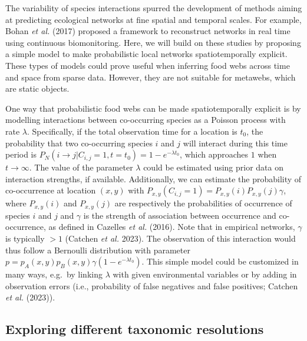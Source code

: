 \documentclass[10pt,oneside]{article}
\begin{document}
The variability of species interactions spurred the development of
methods aiming at predicting ecological networks at fine spatial and
temporal scales. For example, Bohan \emph{et al.} (2017) proposed a
framework to reconstruct networks in real time using continuous
biomonitoring. Here, we will build on these studies by proposing a
simple model to make probabilistic local networks spatiotemporally
explicit. These types of models could prove useful when inferring food
webs across time and space from sparse data. However, they are not
suitable for metawebs, which are static objects.

One way that probabilistic food webs can be made spatiotemporally
explicit is by modelling interactions between co-occurring species as a
Poisson process with rate \(\lambda\). Specifically, if the total
observation time for a location is \(t_0\), the probability that two
co-occurring species \(i\) and \(j\) will interact during this time
period is
\(P_N(i \rightarrow j | C_{i,j} = 1, t = t_0) = 1-e^{-\lambda t_0}\),
which approaches \(1\) when \(t \to \infty\). The value of the parameter
\(\lambda\) could be estimated using prior data on interaction
strengths, if available. Additionally, we can estimate the probability
of co-occurrence at location \((x,y)\) with
\(P_{x,y}(C_{i,j} = 1) = P_{x,y}(i) P_{x,y}(j)\gamma\), where
\(P_{x,y}(i)\) and \(P_{x,y}(j)\) are respectively the probabilities of
occurrence of species \(i\) and \(j\) and \(\gamma\) is the strength of
association between occurrence and co-occurrence, as defined in Cazelles
\emph{et al.} (2016). Note that in empirical networks, \(\gamma\) is
typically \(> 1\) (Catchen \emph{et al.} 2023). The observation of this
interaction would thus follow a Bernoulli distribution with parameter
\(p = p_A(x,y)p_B(x,y)\gamma(1-e^{-\lambda t_0})\). This simple model
could be customized in many ways, e.g.~by linking \(\lambda\) with given
environmental variables or by adding in observation errors (i.e.,
probability of false negatives and false positives; Catchen \emph{et
al.} (2023)).

\hypertarget{exploring-different-taxonomic-resolutions}{%
\subsection{Exploring different taxonomic
resolutions}\label{exploring-different-taxonomic-resolutions}}
\end{document}
